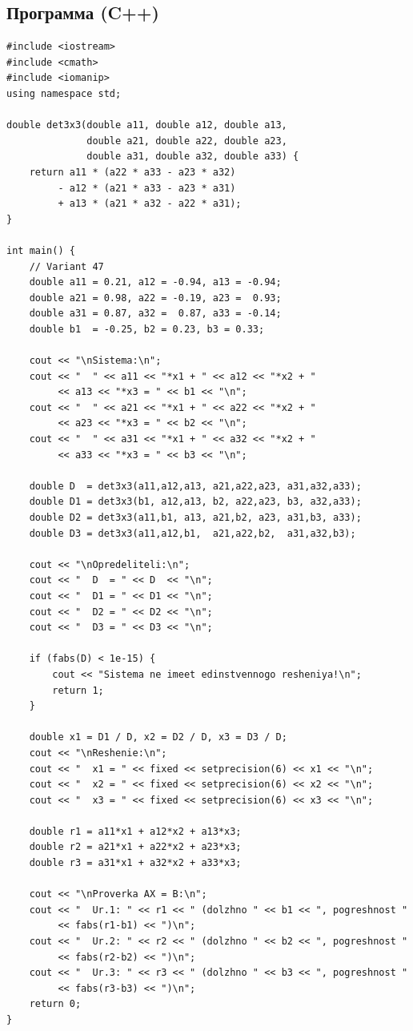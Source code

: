 \documentclass[a4paper,12pt]{article}
\begin{document}
\subsection{Программа (C++)}

\begin{lstlisting}[style=cppstyle, caption={Lab. N2 --- metod Kramera, variant 47}]
#include <iostream>
#include <cmath>
#include <iomanip>
using namespace std;

double det3x3(double a11, double a12, double a13,
              double a21, double a22, double a23,
              double a31, double a32, double a33) {
    return a11 * (a22 * a33 - a23 * a32)
         - a12 * (a21 * a33 - a23 * a31)
         + a13 * (a21 * a32 - a22 * a31);
}

int main() {
    // Variant 47
    double a11 = 0.21, a12 = -0.94, a13 = -0.94;
    double a21 = 0.98, a22 = -0.19, a23 =  0.93;
    double a31 = 0.87, a32 =  0.87, a33 = -0.14;
    double b1  = -0.25, b2 = 0.23, b3 = 0.33;

    cout << "\nSistema:\n";
    cout << "  " << a11 << "*x1 + " << a12 << "*x2 + "
         << a13 << "*x3 = " << b1 << "\n";
    cout << "  " << a21 << "*x1 + " << a22 << "*x2 + "
         << a23 << "*x3 = " << b2 << "\n";
    cout << "  " << a31 << "*x1 + " << a32 << "*x2 + "
         << a33 << "*x3 = " << b3 << "\n";

    double D  = det3x3(a11,a12,a13, a21,a22,a23, a31,a32,a33);
    double D1 = det3x3(b1, a12,a13, b2, a22,a23, b3, a32,a33);
    double D2 = det3x3(a11,b1, a13, a21,b2, a23, a31,b3, a33);
    double D3 = det3x3(a11,a12,b1,  a21,a22,b2,  a31,a32,b3);

    cout << "\nOpredeliteli:\n";
    cout << "  D  = " << D  << "\n";
    cout << "  D1 = " << D1 << "\n";
    cout << "  D2 = " << D2 << "\n";
    cout << "  D3 = " << D3 << "\n";

    if (fabs(D) < 1e-15) {
        cout << "Sistema ne imeet edinstvennogo resheniya!\n";
        return 1;
    }

    double x1 = D1 / D, x2 = D2 / D, x3 = D3 / D;
    cout << "\nReshenie:\n";
    cout << "  x1 = " << fixed << setprecision(6) << x1 << "\n";
    cout << "  x2 = " << fixed << setprecision(6) << x2 << "\n";
    cout << "  x3 = " << fixed << setprecision(6) << x3 << "\n";

    double r1 = a11*x1 + a12*x2 + a13*x3;
    double r2 = a21*x1 + a22*x2 + a23*x3;
    double r3 = a31*x1 + a32*x2 + a33*x3;

    cout << "\nProverka AX = B:\n";
    cout << "  Ur.1: " << r1 << " (dolzhno " << b1 << ", pogreshnost "
         << fabs(r1-b1) << ")\n";
    cout << "  Ur.2: " << r2 << " (dolzhno " << b2 << ", pogreshnost "
         << fabs(r2-b2) << ")\n";
    cout << "  Ur.3: " << r3 << " (dolzhno " << b3 << ", pogreshnost "
         << fabs(r3-b3) << ")\n";
    return 0;
}
\end{lstlisting}
\end{document}
